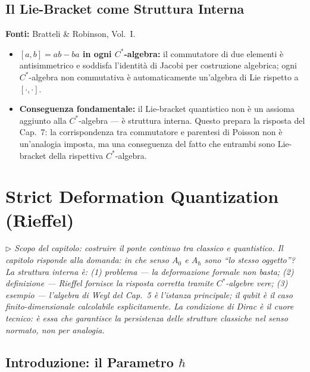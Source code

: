 \documentclass[12pt, a4paper]{article}
\newcommand{\fonti}[1]{%
	\begin{fontebox}
		\textcolor{fontecolor}{\footnotesize\textbf{Fonti:} #1}
	\end{fontebox}%
}
\newcommand{\nota}[1]{%
	\par\smallskip
	\noindent\textit{\small $\triangleright$\; #1}
	\par\smallskip
}
\begin{document}
	\subsection{Il Lie-Bracket come Struttura Interna}
	\label{sec:liebracketinternal}
	
	\fonti{Bratteli \& Robinson, Vol.~I.}
	
	\begin{itemize}
		\item \textbf{$[a,b] = ab - ba$ in ogni $C^*$-algebra:} il commutatore di due
		elementi è antisimmetrico e soddisfa l'identità di Jacobi per costruzione
		algebrica; ogni $C^*$-algebra non commutativa è automaticamente un'algebra
		di Lie rispetto a $[\cdot, \cdot]$.
		\item \textbf{Conseguenza fondamentale:} il Lie-bracket quantistico non è un
		assioma aggiunto alla $C^*$-algebra --- è struttura interna. Questo prepara
		la risposta del Cap.\ 7: la corrispondenza tra commutatore e parentesi di Poisson
		non è un'analogia imposta, ma una conseguenza del fatto che entrambi sono
		Lie-bracket della rispettiva $C^*$-algebra.
	\end{itemize}
	
	\newpage
	\section{Strict Deformation Quantization (Rieffel)}
	
	\nota{Scopo del capitolo: costruire il ponte continuo tra classico e quantistico.
		Il capitolo risponde alla domanda: in che senso $A_0$ e $A_\hbar$ sono ``lo stesso
		oggetto''? La struttura interna è: (1) problema --- la deformazione formale non basta;
		(2) definizione --- Rieffel fornisce la risposta corretta tramite $C^*$-algebre vere;
		(3) esempio --- l'algebra di Weyl del Cap.\ 5 è l'istanza principale; il qubit
		è il caso finito-dimensionale calcolabile esplicitamente. La condizione di Dirac
		è il cuore tecnico: è essa che garantisce la persistenza delle strutture classiche
		nel senso normato, non per analogia.}
	
	\subsection{Introduzione: il Parametro $\hbar$}
	
\end{document}
